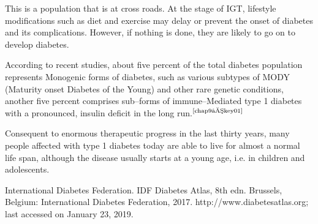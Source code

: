 This is a population that is at cross roads. At the stage of IGT, lifestyle modifications such as diet and exercise may delay or prevent the onset of diabetes and its complications. However, if nothing is done, they are likely to go on to develop diabetes.

According to recent studies, about five percent of the total diabetes population represents Monogenic forms of diabetes, such as various subtypes of MODY (Maturity onset Diabetes of the Young) and other rare genetic conditions, another five percent comprises sub–forms of immune–Mediated type 1 diabetes with a pronounced, insulin deficit in the long run.$^{\text{\cite{chap9–key01}}}$

Consequent to enormous therapeutic progress in the last thirty years, many people affected with type 1 diabetes today are able to live for almost a normal life span, although the disease usually starts at a young age, i.e. in children and adolescents.

\begin{thebibliography}{99}
 International Diabetes Federation. IDF Diabetes Atlas, 8th edn. Brussels, Belgium: International Diabetes Federation, 2017. http://www.diabetesatlas.org; last accessed on January 23, 2019.
\end{thebibliography}




